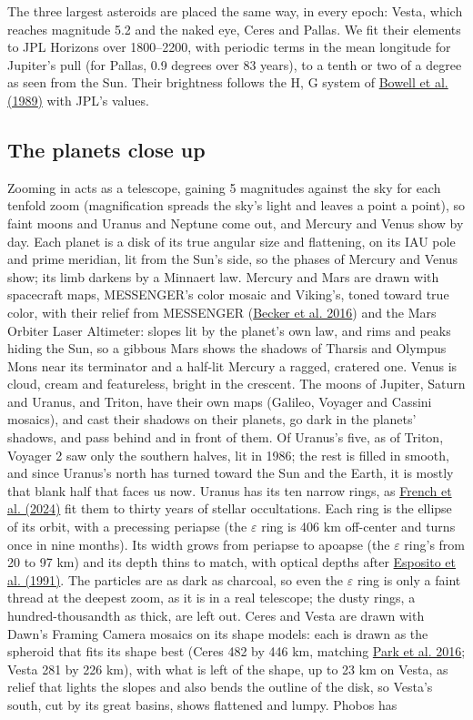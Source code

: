 \documentclass[9pt,twocolumn]{extarticle}
\begin{document}
The three largest asteroids are placed the same way, in every epoch: Vesta, which reaches magnitude 5.2 and the naked eye, Ceres and Pallas. We fit their elements to JPL Horizons over 1800--2200, with periodic terms in the mean longitude for Jupiter's pull (for Pallas, 0.9 degrees over 83 years), to a tenth or two of a degree as seen from the Sun. Their brightness follows the H, G system of \protect\hyperlink{cite.bowell1989}{Bowell et al. (1989)} with JPL's values.


\subsection{The planets close up}\label{the-planets-close-up}

Zooming in acts as a telescope, gaining 5 magnitudes against the sky for each tenfold zoom (magnification spreads the sky's light and leaves a point a point), so faint moons and Uranus and Neptune come out, and Mercury and Venus show by day. Each planet is a disk of its true angular size and flattening, on its IAU pole and prime meridian, lit from the Sun's side, so the phases of Mercury and Venus show; its limb darkens by a Minnaert law. Mercury and Mars are drawn with spacecraft maps, MESSENGER's color mosaic and Viking's, toned toward true color, with their relief from MESSENGER (\protect\hyperlink{cite.becker2016}{Becker et al. 2016}) and the Mars Orbiter Laser Altimeter: slopes lit by the planet's own law, and rims and peaks hiding the Sun, so a gibbous Mars shows the shadows of Tharsis and Olympus Mons near its terminator and a half-lit Mercury a ragged, cratered one. Venus is cloud, cream and featureless, bright in the crescent. The moons of Jupiter, Saturn and Uranus, and Triton, have their own maps (Galileo, Voyager and Cassini mosaics), and cast their shadows on their planets, go dark in the planets' shadows, and pass behind and in front of them. Of Uranus's five, as of Triton, Voyager 2 saw only the southern halves, lit in 1986; the rest is filled in smooth, and since Uranus's north has turned toward the Sun and the Earth, it is mostly that blank half that faces us now. Uranus has its ten narrow rings, as \protect\hyperlink{cite.french2024}{French et al. (2024)} fit them to thirty years of stellar occultations. Each ring is the ellipse of its orbit, with a precessing periapse (the $\varepsilon$ ring is 406 km off-center and turns once in nine months). Its width grows from periapse to apoapse (the $\varepsilon$ ring's from 20 to 97 km) and its depth thins to match, with optical depths after \protect\hyperlink{cite.esposito1991}{Esposito et al. (1991)}. The particles are as dark as charcoal, so even the $\varepsilon$ ring is only a faint thread at the deepest zoom, as it is in a real telescope; the dusty rings, a hundred-thousandth as thick, are left out. Ceres and Vesta are drawn with Dawn's Framing Camera mosaics on its shape models: each is drawn as the spheroid that fits its shape best (Ceres 482 by 446 km, matching \protect\hyperlink{cite.park2016}{Park et al. 2016}; Vesta 281 by 226 km), with what is left of the shape, up to 23 km on Vesta, as relief that lights the slopes and also bends the outline of the disk, so Vesta's south, cut by its great basins, shows flattened and lumpy. Phobos has 
\end{document}
